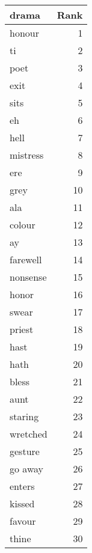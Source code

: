\begin{table}
\label{tab:drama_terms}
\begin{tabular}{lr}
\toprule
drama & Rank \\
\midrule
honour & 1 \\
ti & 2 \\
poet & 3 \\
exit & 4 \\
sits & 5 \\
eh & 6 \\
hell & 7 \\
mistress & 8 \\
ere & 9 \\
grey & 10 \\
ala & 11 \\
colour & 12 \\
ay & 13 \\
farewell & 14 \\
nonsense & 15 \\
honor & 16 \\
swear & 17 \\
priest & 18 \\
hast & 19 \\
hath & 20 \\
bless & 21 \\
aunt & 22 \\
staring & 23 \\
wretched & 24 \\
gesture & 25 \\
go away & 26 \\
enters & 27 \\
kissed & 28 \\
favour & 29 \\
thine & 30 \\
\bottomrule
\end{tabular}
\end{table}
